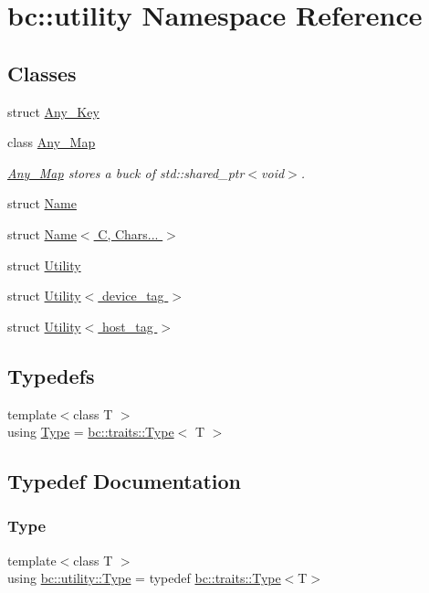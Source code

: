 \hypertarget{namespacebc_1_1utility}{}\section{bc\+:\+:utility Namespace Reference}
\label{namespacebc_1_1utility}
\subsection*{Classes}
\begin{DoxyCompactItemize}
\item 
struct \hyperlink{structbc_1_1utility_1_1Any__Key}{Any\+\_\+\+Key}
\item 
class \hyperlink{classbc_1_1utility_1_1Any__Map}{Any\+\_\+\+Map}
\begin{DoxyCompactList}\small\item\em \hyperlink{classbc_1_1utility_1_1Any__Map}{Any\+\_\+\+Map} stores a buck of std\+::shared\+\_\+ptr$<$void$>$. \end{DoxyCompactList}\item 
struct \hyperlink{structbc_1_1utility_1_1Name}{Name}
\item 
struct \hyperlink{structbc_1_1utility_1_1Name_3_01C_00_01Chars_8_8_8_01_4}{Name$<$ C, Chars... $>$}
\item 
struct \hyperlink{structbc_1_1utility_1_1Utility}{Utility}
\item 
struct \hyperlink{structbc_1_1utility_1_1Utility_3_01device__tag_01_4}{Utility$<$ device\+\_\+tag $>$}
\item 
struct \hyperlink{structbc_1_1utility_1_1Utility_3_01host__tag_01_4}{Utility$<$ host\+\_\+tag $>$}
\end{DoxyCompactItemize}
\subsection*{Typedefs}
\begin{DoxyCompactItemize}
\item 
{\footnotesize template$<$class T $>$ }\\using \hyperlink{namespacebc_1_1utility_a2bb54267cce1230b5f59432f262891d4}{Type} = \hyperlink{structbc_1_1traits_1_1Type}{bc\+::traits\+::\+Type}$<$ T $>$
\end{DoxyCompactItemize}


\subsection{Typedef Documentation}
\mbox{\label{namespacebc_1_1utility_a2bb54267cce1230b5f59432f262891d4}} 
\subsubsection{\texorpdfstring{Type}{Type}}
{\footnotesize\ttfamily template$<$class T $>$ \\
using \hyperlink{namespacebc_1_1utility_a2bb54267cce1230b5f59432f262891d4}{bc\+::utility\+::\+Type} = typedef \hyperlink{structbc_1_1traits_1_1Type}{bc\+::traits\+::\+Type}$<$T$>$}

